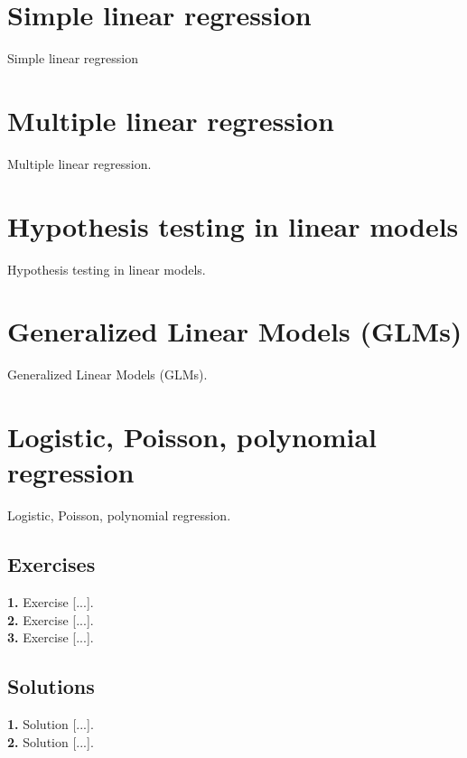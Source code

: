 \documentclass{book}
\begin{document}
\section{Simple linear regression}
Simple linear regression

\newpage

\section{Multiple linear regression}
Multiple linear regression.

\newpage

\section{Hypothesis testing in linear models}
Hypothesis testing in linear models.

\newpage

\section{Generalized Linear Models (GLMs)}
Generalized Linear Models (GLMs).

\newpage

\section{Logistic, Poisson, polynomial regression}
Logistic, Poisson, polynomial regression.

\newpage

\subsection*{Exercises}

\textbf{1.} Exercise [...].\\

\textbf{2.} Exercise [...].\\

\textbf{3.} Exercise [...].\\

\newpage

\subsection*{Solutions}

\textbf{1.} Solution [...].\\

\textbf{2.} Solution [...].\\
\end{document}
